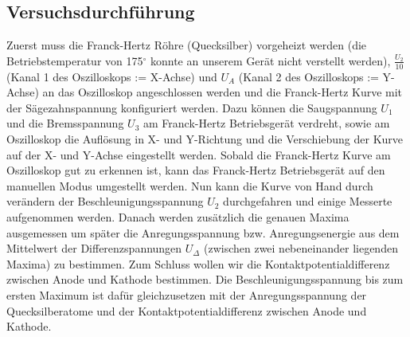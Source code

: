 \documentclass[12pt,a4paper]{article}
\begin{document}
\subsection{Versuchsdurchführung}
Zuerst muss die Franck-Hertz Röhre (Quecksilber) vorgeheizt werden (die Betriebstemperatur von 175$^{\circ}$ konnte an unserem Gerät nicht verstellt werden), $\frac{U_2}{10}$ (Kanal 1 des Oszilloskops := X-Achse) und $U_A$ (Kanal 2 des Oszilloskops := Y-Achse) an das Oszilloskop angeschlossen werden und die Franck-Hertz Kurve mit der Sägezahnspannung konfiguriert werden. Dazu können die Saugspannung $U_1$ und die Bremsspannung $U_3$ am Franck-Hertz Betriebsgerät verdreht, sowie am Oszilloskop die Auflösung in X- und Y-Richtung und die Verschiebung der Kurve auf der X- und Y-Achse eingestellt werden. Sobald die Franck-Hertz Kurve am Oszilloskop gut zu erkennen ist, kann das Franck-Hertz Betriebsgerät auf den manuellen Modus umgestellt werden. Nun kann die Kurve von Hand durch verändern der Beschleunigungsspannung $U_2$ durchgefahren und einige Messerte aufgenommen werden. Danach werden zusätzlich die genauen Maxima ausgemessen um später die Anregungsspannung bzw. Anregungsenergie aus dem Mittelwert der Differenzspannungen $U_{\Delta}$ (zwischen zwei nebeneinander liegenden Maxima) zu bestimmen.
Zum Schluss wollen wir die Kontaktpotentialdifferenz zwischen Anode und Kathode bestimmen.
Die Beschleunigungsspannung bis zum ersten Maximum ist dafür gleichzusetzen mit der Anregungsspannung der Quecksilberatome und der Kontaktpotentialdifferenz zwischen Anode und Kathode.
\end{document}
